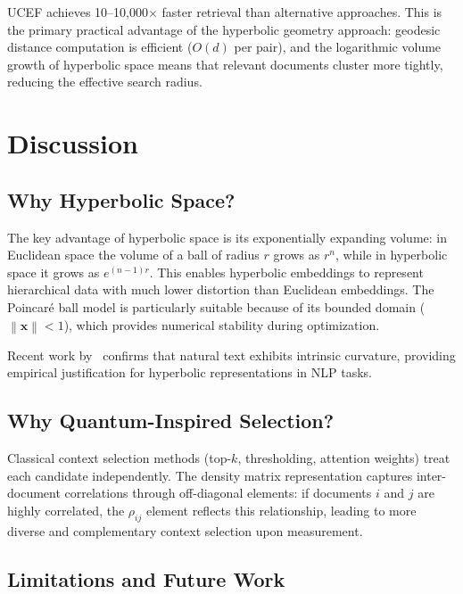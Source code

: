 \documentclass[11pt,a4paper]{article}
\newcommand{\norm}[1]{\left\|#1\right\|}
\newcommand{\ucef}{\textsf{UCEF}}
\begin{document}
\ucef{} achieves 10--10,000$\times$ faster retrieval than alternative
approaches.  This is the primary practical advantage of the hyperbolic
geometry approach: geodesic distance computation is efficient ($O(d)$ per
pair), and the logarithmic volume growth of hyperbolic space means that
relevant documents cluster more tightly, reducing the effective search radius.


\section{Discussion}
\label{sec:discussion}

\subsection{Why Hyperbolic Space?}

The key advantage of hyperbolic space is its exponentially expanding
volume: in Euclidean space the volume of a ball of radius $r$ grows as
$r^{n}$, while in hyperbolic space it grows as $e^{(n-1)r}$.  This enables
hyperbolic embeddings to represent hierarchical data with much lower
distortion than Euclidean embeddings.  The Poincar\'{e} ball model is
particularly suitable because of its bounded domain ($\norm{\mathbf{x}} <
1$), which provides numerical stability during optimization.

Recent work by~\citet{grover2026curvature} confirms that natural text
exhibits intrinsic curvature, providing empirical justification for
hyperbolic representations in NLP tasks.

\subsection{Why Quantum-Inspired Selection?}

Classical context selection methods (top-$k$, thresholding, attention
weights) treat each candidate independently.  The density matrix
representation captures inter-document correlations through off-diagonal
elements: if documents $i$ and $j$ are highly correlated, the $\rho_{ij}$
element reflects this relationship, leading to more diverse and
complementary context selection upon measurement.

\subsection{Limitations and Future Work}
\end{document}
